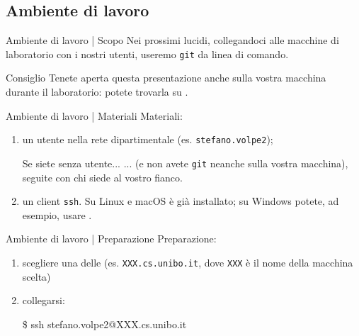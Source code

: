 \documentclass{beamer}
\begin{document}
\subsection{Ambiente di lavoro}
\begin{frame}{Ambiente di lavoro | Scopo}
  Nei prossimi lucidi, collegandoci alle macchine di laboratorio con i nostri
  utenti, useremo \texttt{git} da linea di comando.\pause
  \begin{block}{Consiglio}
    Tenete aperta questa presentazione anche sulla vostra macchina durante il
    laboratorio: potete trovarla su
    \href{https://csunibo.github.io/lab}{}.
  \end{block}
\end{frame}

\begin{frame}{Ambiente di lavoro | Materiali}
  Materiali:
  \begin{enumerate}
    \item<1->un utente nella rete dipartimentale (es. \texttt{stefano.volpe2});
      \begin{alertblock}{Se siete senza utente...}
        ... (e non avete \texttt{git} neanche sulla vostra macchina), seguite con
        chi siede al vostro fianco.
      \end{alertblock}\pause
    \item<2->un client \texttt{ssh}. Su Linux e macOS è già installato; su
      Windows potete, ad esempio, usare
      \href{https://chrome.google.com/webstore/detail/secure-shell/iodihamcpbpeioajjeobimgagajmlibd}{}.
  \end{enumerate}
\end{frame}

\begin{frame}{Ambiente di lavoro | Preparazione}
  Preparazione:
  \begin{enumerate}
    \item<1->scegliere una delle \href{https://disi.unibo.it/it/dipartimento/servizi-tecnici-e-amministrativi/servizi-informatici/accesso-remoto}{} (es. \texttt{XXX.cs.unibo.it}, dove \texttt{XXX} è il
      nome della macchina scelta)
    \item<2-> collegarsi:
      \begin{semiverbatim}
        \$ ssh stefano.volpe2@XXX.cs.unibo.it
      \end{semiverbatim}
  \end{enumerate}
\end{frame}
\end{document}
